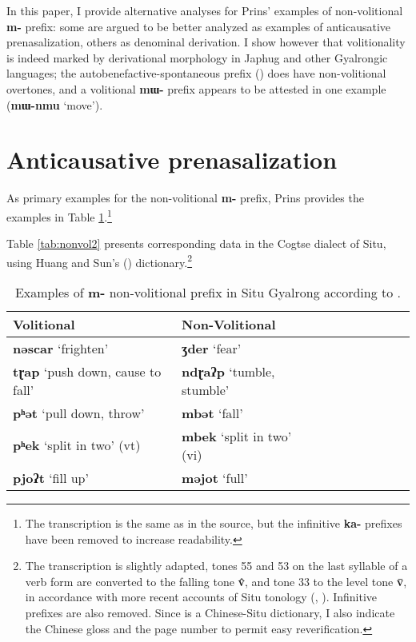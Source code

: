 \documentclass[oneside,a4paper,11pt]{article}
\newcommand{\ipa}[1]{\textbf{{\phon\mbox{#1}}}} %
\begin{document}
In this paper, I provide alternative analyses for Prins' examples of non-volitional \ipa{m-} prefix: some are argued to be better analyzed as examples of anticausative prenasalization, others as denominal derivation. I show however that volitionality is indeed marked by derivational morphology in Japhug and other Gyalrongic languages; the autobenefactive-spontaneous prefix (\citealt{jacques15spontaneous}) does have non-volitional overtones, and a volitional \ipa{mɯ-} prefix appears to be attested in one example (\ipa{mɯ-nmu} `move').

\section{Anticausative prenasalization}
As primary examples for the non-volitional \ipa{m-} prefix, Prins provides the examples in Table \ref{tab:nonvol}.\footnote{The transcription is the same as in the source, but the infinitive \ipa{ka-} prefixes have been removed to increase readability.}

Table \ref{tab:nonvol2} presents corresponding data in the Cogtse dialect of Situ, using Huang and Sun's (\citeyear{huangsun02}) dictionary.\footnote{The transcription is slightly adapted, tones 55 and 53 on the last syllable of a verb form are converted to the falling tone \ipa{v̂}, and tone 33 to the level tone \ipa{v̄}, in accordance with more recent accounts of Situ tonology (\citealt{jackson05yingao}, \citealt{linyj12tone}). Infinitive prefixes are also removed. Since \citet{huangsun02} is a Chinese-Situ dictionary, I also indicate the Chinese gloss and the page number to permit easy reverification. }

\begin{table}[h]
\caption{Examples of \ipa{m-} non-volitional prefix in Situ Gyalrong according to \citet[505]{prins16kyomkyo}. } \label{tab:nonvol} \centering
\begin{tabular}{lllllllll}
\toprule
Volitional & Non-Volitional \\
\midrule
\ipa{nəscar} `frighten' & \ipa{ʒder} `fear'  \\
\ipa{tɽap} `push down, cause to fall' & \ipa{ndɽaʔp} `tumble, stumble'  \\
\ipa{pʰət} `pull down, throw' & \ipa{mbət} `fall'  \\
\ipa{pʰek} `split in two' (vt)& \ipa{mbek} `split in two' (vi)  \\
\ipa{pjoʔt} `fill up' & \ipa{məjot} `full'  \\
\bottomrule
\end{tabular}
\end{table}
\end{document}
